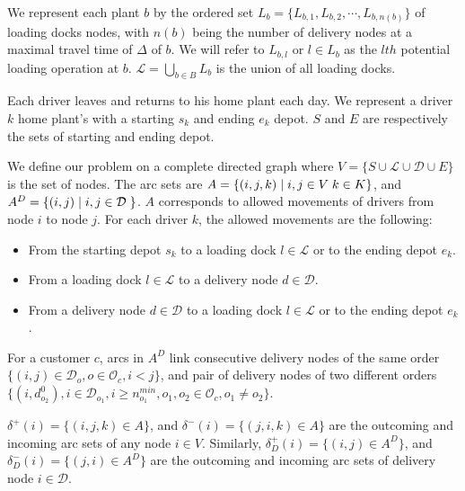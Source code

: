 \documentclass{article}
\begin{document}
We represent each plant $b$ by the ordered set $L_b=\{L_{b,1}, L_{b,2},\cdots, L_{b,n(b)}\}$ of loading docks nodes, with $n(b)$ being the number of delivery nodes at a maximal travel time of $\Delta$ of $b$. We will refer to $L_{b,l}$ or  $l \in L_b$  as the $lth$ potential loading operation at $b$. $\mathcal{L}=\bigcup_{b\in B} L_b$ is the union of all loading docks. 

Each driver leaves and returns to his home plant each day. We represent a driver $k$ home plant's with a starting $s_k$ and ending $e_k$ depot. $S$ and $E$ are respectively the sets of starting and ending depot.

We define our problem on a complete directed graph where $V=\{ S \cup \mathcal{L} \cup \mathcal{D} \cup E\}$ is the set of nodes. The arc sets are $A =  \{(i,j,k) \hspace*{1mm} \vert \hspace*{1mm} i, j \in V \hspace{1mm} k\in K \}$, and $A^D = \{(i,j) \hspace*{1mm} \vert \hspace*{1mm} i, j \in \mathcal{D} \hspace{1mm} \}$. 
$A$ corresponds to allowed movements of drivers from node $i$ to node $j$. For each driver $k$, the allowed movements are the following:
\begin{itemize}
    \item From the starting depot $s_k$ to a loading dock $l \in \mathcal{L}$ or to the ending depot $e_k$.
    \item From a loading dock $l \in \mathcal{L}$ to a delivery node $d \in \mathcal{D}$.
    \item From a delivery node  $d \in \mathcal{D}$ to a loading dock $l \in \mathcal{L}$ or to the ending depot $e_k$.
\end{itemize}

For a customer $c$, arcs in $A^D$ link consecutive delivery nodes of the same order   $\lbrace (i,j)\in \mathcal{D}_o, o \in \mathcal{O}_c, i < j  \rbrace$, and pair of delivery nodes of two different orders $ \lbrace (i,d^{0}_{o_2}),  i \in \mathcal{D}_{o_1}, i \geq n^{min}_{o_1}, o_1, o_2 \in \mathcal{O}_c, o_1 \neq o_2 \rbrace $.

$\delta^{+}(i) = \{(i, j,k) \in A \}$, and $\delta^{-}(i) = \{(j, i,k) \in A \}$ are the outcoming and incoming arc sets of any node $i \in V$. Similarly, $\delta^{+}_D(i) = \{(i, j)  \in A^D\}$, and $\delta^{-}_D(i) = \{(j, i) \in A^D \}$ are the outcoming and incoming arc sets of delivery node $i \in \mathcal{D}$.
\end{document}
